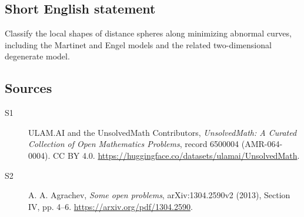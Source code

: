 \documentclass[11pt]{article}
\begin{document}
\subsection{Short English statement}
Classify the local shapes of distance spheres along minimizing abnormal curves, including the Martinet and Engel models and the related two-dimensional degenerate model.
\subsection{Sources}
\begin{description}
\item[\hypertarget{source:6500004:1}{S1}] ULAM.AI and the UnsolvedMath Contributors, \emph{UnsolvedMath: A Curated Collection of Open Mathematics Problems}, record 6500004 (AMR-064-0004). CC BY 4.0. \url{https://huggingface.co/datasets/ulamai/UnsolvedMath}.
\item[\hypertarget{source:6500004:2}{S2}] A. A. Agrachev, \emph{Some open problems}, arXiv:1304.2590v2 (2013), Section IV, pp. 4--6. \url{https://arxiv.org/pdf/1304.2590}.
\end{description}
\label{end:6500004}
\end{document}
